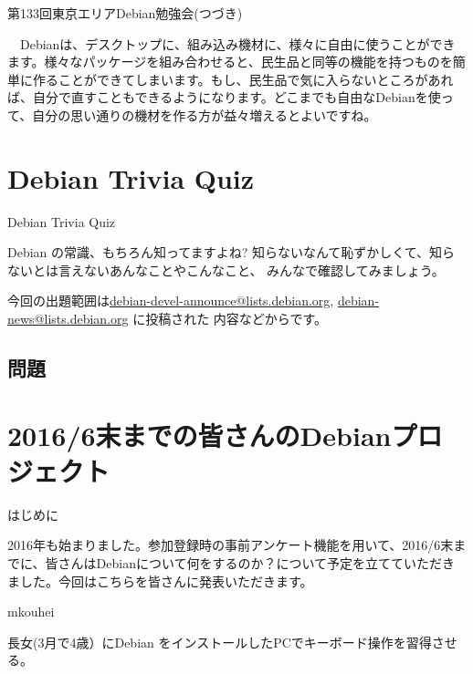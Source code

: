 \begin{frame}{第133回東京エリアDebian勉強会(つづき)}

　Debianは、デスクトップに、組み込み機材に、様々に自由に使うことができます。様々なパッケージを組み合わせると、民生品と同等の機能を持つものを簡単に作ることができてしまいます。もし、民生品で気に入らないところがあれば、自分で直すこともできるようになります。どこまでも自由なDebianを使って、自分の思い通りの機材を作る方が益々増えるとよいですね。
  
\end{frame}

\section{Debian Trivia Quiz}
\begin{frame}{Debian Trivia Quiz}

  Debian の常識、もちろん知ってますよね?
知らないなんて恥ずかしくて、知らないとは言えないあんなことやこんなこと、
みんなで確認してみましょう。

今回の出題範囲は\url{debian-devel-announce@lists.debian.org},
\url{debian-news@lists.debian.org} に投稿された
内容などからです。

\end{frame}

\subsection{問題}


\fi

\section{2016/6末までの皆さんのDebianプロジェクト}

\begin{frame}{はじめに}

  2016年も始まりました。参加登録時の事前アンケート機能を用いて、2016/6末までに、皆さんはDebianについて何をするのか？について予定を立てていただきました。今回はこちらを皆さんに発表いただきます。
  
\end{frame}

\begin{frame}{mkouhei}

 長女(3月で4歳）にDebian をインストールしたPCでキーボード操作を習得させる。

\end{frame}

